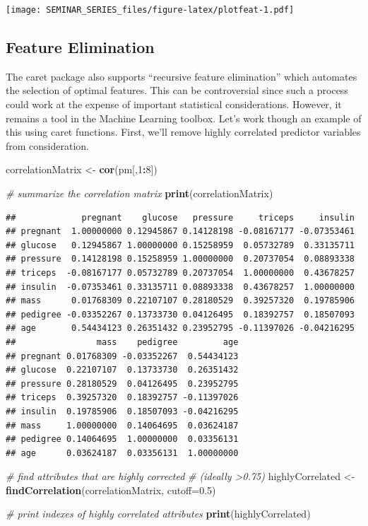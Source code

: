 \documentclass[]{book}
\newenvironment{Shaded}{\begin{snugshade}}{\end{snugshade}}
\newcommand{\KeywordTok}[1]{\textcolor[rgb]{0.13,0.29,0.53}{\textbf{#1}}}
\newcommand{\DataTypeTok}[1]{\textcolor[rgb]{0.13,0.29,0.53}{#1}}
\newcommand{\DecValTok}[1]{\textcolor[rgb]{0.00,0.00,0.81}{#1}}
\newcommand{\FloatTok}[1]{\textcolor[rgb]{0.00,0.00,0.81}{#1}}
\newcommand{\StringTok}[1]{\textcolor[rgb]{0.31,0.60,0.02}{#1}}
\newcommand{\CommentTok}[1]{\textcolor[rgb]{0.56,0.35,0.01}{\textit{#1}}}
\newcommand{\OperatorTok}[1]{\textcolor[rgb]{0.81,0.36,0.00}{\textbf{#1}}}
\newcommand{\NormalTok}[1]{#1}
\begin{document}
\texttt{[image: SEMINAR\_SERIES\_files/figure-latex/plotfeat-1.pdf]}

\subsection{Feature Elimination}\label{feature-elimination}

The caret package also supports ``recursive feature elimination'' which
automates the selection of optimal features. This can be controversial
since such a process could work at the expense of important statistical
considerations. However, it remains a tool in the Machine Learning
toolbox. Let's work though an example of this using caret functions.
First, we'll remove highly correlated predictor variables from
consideration.

\begin{Shaded}
\begin{Highlighting}[]
\NormalTok{correlationMatrix <-}\StringTok{ }\KeywordTok{cor}\NormalTok{(pm[,}\DecValTok{1}\OperatorTok{:}\DecValTok{8}\NormalTok{])}

\CommentTok{# summarize the correlation matrix}
\KeywordTok{print}\NormalTok{(correlationMatrix)}
\end{Highlighting}
\end{Shaded}

\begin{verbatim}
##             pregnant    glucose   pressure     triceps     insulin
## pregnant  1.00000000 0.12945867 0.14128198 -0.08167177 -0.07353461
## glucose   0.12945867 1.00000000 0.15258959  0.05732789  0.33135711
## pressure  0.14128198 0.15258959 1.00000000  0.20737054  0.08893338
## triceps  -0.08167177 0.05732789 0.20737054  1.00000000  0.43678257
## insulin  -0.07353461 0.33135711 0.08893338  0.43678257  1.00000000
## mass      0.01768309 0.22107107 0.28180529  0.39257320  0.19785906
## pedigree -0.03352267 0.13733730 0.04126495  0.18392757  0.18507093
## age       0.54434123 0.26351432 0.23952795 -0.11397026 -0.04216295
##                mass    pedigree         age
## pregnant 0.01768309 -0.03352267  0.54434123
## glucose  0.22107107  0.13733730  0.26351432
## pressure 0.28180529  0.04126495  0.23952795
## triceps  0.39257320  0.18392757 -0.11397026
## insulin  0.19785906  0.18507093 -0.04216295
## mass     1.00000000  0.14064695  0.03624187
## pedigree 0.14064695  1.00000000  0.03356131
## age      0.03624187  0.03356131  1.00000000
\end{verbatim}

\begin{Shaded}
\begin{Highlighting}[]
\CommentTok{# find attributes that are highly corrected }
\CommentTok{# (ideally >0.75)}
\NormalTok{highlyCorrelated <-}\StringTok{ }\KeywordTok{findCorrelation}\NormalTok{(correlationMatrix,}
                                    \DataTypeTok{cutoff=}\FloatTok{0.5}\NormalTok{)}

\CommentTok{# print indexes of highly correlated attributes}
\KeywordTok{print}\NormalTok{(highlyCorrelated)}
\end{Highlighting}
\end{Shaded}
\end{document}
